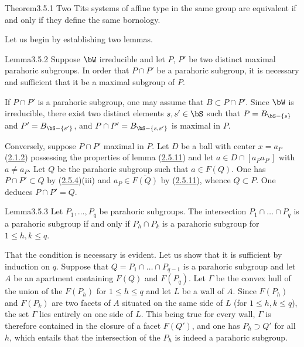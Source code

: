 \documentclass[12pt,a4paper,oneside,english]{smfart}
\makeatletter
\newcommand{\btanchor}[1]{\leavevmode\Hy@raisedlink{\hypertarget{bt:#1}{}}}
\newcommand{\btref}[1]{\hyperlink{bt:#1}{#1}}
\theoremstyle{definition}
\theoremstyle{bt}
\makeatother
\begin{document}
\begin{state}{Theorem}{3.5.1}\btanchor{3.5.1}
Two Tits systems of affine type in the same group are equivalent if and only
if they define the same bornology.
\end{state}

Let us begin by establishing two lemmas.

\begin{state}{Lemma}{3.5.2}\btanchor{3.5.2}
Suppose $\bW$ irreducible and let $P$, $P'$ be two distinct maximal parahoric
subgroups. In order that $P\cap P'$ be a parahoric subgroup, it is necessary
and sufficient that it be a maximal subgroup of $P$.
\end{state}

If $P \cap P'$ is a parahoric subgroup, one may assume that
$B \subset P\cap P'$. Since $\bW$ is irreducible, there exist two distinct
elements $s, s' \in \bS$ such that $P = B_{\bS - \{s\}}$ and
$P' = B_{\bS-\{s'\}}$, and $P\cap P' = B_{\bS-\{s,s'\}}$ is maximal in $P$.

Conversely, suppose $P\cap P'$ maximal in $P$. Let $D$ be a ball with center
$x = a_P$ (\btref{2.1.2}) possessing the properties of lemma (\btref{2.5.11}) and let
$a \in D \cap [a_P a_{P'}]$ with $a \neq a_P$. Let $Q$ be the parahoric
subgroup such that $a \in F(Q)$. One has $P\cap P' \subset Q$ by (\btref{2.5.4})(iii)
and $a_P \in \overline{F(Q)}$ by (\btref{2.5.11}), whence $Q \subset P$. One deduces
$P\cap P' = Q$.

\begin{state}{Lemma}{3.5.3}\btanchor{3.5.3}
Let $P_1,\dots,P_q$ be parahoric subgroups. The intersection
$P_1\cap\dots\cap P_q$ is a parahoric subgroup if and only if $P_h \cap P_k$
is a parahoric subgroup for $1\leqslant h,k\leqslant q$.
\end{state}

That the condition is necessary is evident. Let us show that it is sufficient
by induction on $q$. Suppose that $Q = P_1\cap\dots\cap P_{q-1}$ is a
parahoric subgroup and let $A$ be an apartment containing $F(Q)$ and
$F(P_q)$. Let $\Gamma$ be the convex hull of the union of the $F(P_h)$ for
$1\leqslant h\leqslant q$ and let $L$ be a wall of $A$. Since $F(P_h)$ and
$F(P_k)$ are two facets of $A$ situated on the same side of $L$ (for
$1\leqslant h,k \leqslant q$), the set $\Gamma$ lies entirely on one side of
$L$. This being true for every wall, $\Gamma$ is therefore contained in the
closure of a facet $F(Q')$, and one has $P_h \supset Q'$ for all $h$, which
entails that the intersection of the $P_h$ is indeed a parahoric subgroup.
\end{document}
